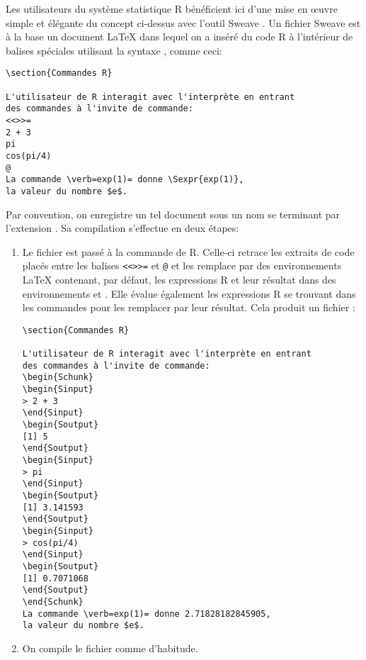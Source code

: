 Les utilisateurs du système statistique R bénéficient ici d'une mise
en œuvre simple et élégante du concept ci-dessus avec l'outil Sweave
\citep{Sweave}. Un fichier Sweave est à la base un document {\LaTeX}
dans lequel on a inséré du code R à l'intérieur de balises spéciales
utilisant la syntaxe  \citep{noweb}, comme ceci:
\begin{lstlisting}
\section{Commandes R}

L'utilisateur de R interagit avec l'interprète en entrant
des commandes à l'invite de commande:
<<>>=
2 + 3
pi
cos(pi/4)
@
La commande \verb=exp(1)= donne \Sexpr{exp(1)},
la valeur du nombre $e$.
\end{lstlisting}

Par convention, on enregistre un tel document sous un nom se terminant
par l'extension . Sa compilation s'effectue
en deux étapes:
\begin{enumerate}
\item Le fichier  est passé à la commande 
  de R. Celle-ci retrace les extraits de code placés entre les balises
  \verb|<<>>=| et \verb|@| et les remplace par des environnements
  {\LaTeX} contenant, par défaut, les expressions R et leur résultat
  dans des environnements  et . Elle évalue
  également les expressions R se trouvant dans les commandes
  \cmd{\Sexpr} pour les remplacer par leur résultat. Cela produit un
  fichier :
\begin{lstlisting}
\section{Commandes R}

L'utilisateur de R interagit avec l'interprète en entrant
des commandes à l'invite de commande:
\begin{Schunk}
\begin{Sinput}
> 2 + 3
\end{Sinput}
\begin{Soutput}
[1] 5
\end{Soutput}
\begin{Sinput}
> pi
\end{Sinput}
\begin{Soutput}
[1] 3.141593
\end{Soutput}
\begin{Sinput}
> cos(pi/4)
\end{Sinput}
\begin{Soutput}
[1] 0.7071068
\end{Soutput}
\end{Schunk}
La commande \verb=exp(1)= donne 2.71828182845905,
la valeur du nombre $e$.
\end{lstlisting}
\item On compile le fichier  comme d'habitude.
\end{enumerate}

